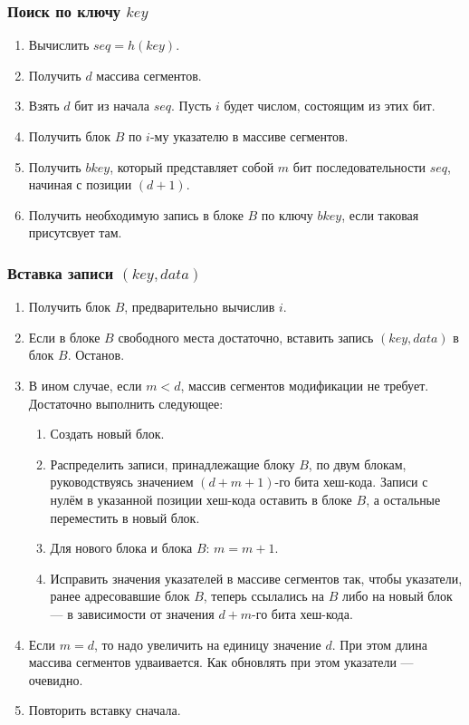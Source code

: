 \subsubsection{Поиск по ключу $key$}
\begin{enumerate}
  \item Вычислить $seq = h(key)$.
  \item Получить $d$ массива сегментов.
  \item Взять $d$ бит из начала $seq$. Пусть $i$ будет числом, состоящим из этих бит.
  \item Получить блок $B$ по $i$-му указателю в массиве сегментов.
  \item Получить $bkey$, который представляет собой $m$ бит последовательности $seq$, начиная с позиции $(d + 1)$.
  \item Получить необходимую запись в блоке $B$ по ключу $bkey$, если таковая присутсвует там.
\end{enumerate}

\subsubsection{Вставка записи $(key, data)$}

\begin{enumerate}
  \item Получить блок $B$, предварительно вычислив $i$.
  \item Если в блоке $B$ свободного места достаточно, вставить запись $(key, data)$ в блок $B$. Останов.
  \item В ином случае, если $m < d$, массив сегментов модификации не требует. Достаточно выполнить следующее:
    \begin{enumerate}
      \item Создать новый блок.
      \item Распределить записи, принадлежащие блоку $B$, по двум блокам, руководствуясь значением $(d + m + 1)$-го бита хеш-кода. Записи с нулём в указанной позиции хеш-кода оставить в блоке $B$, а остальные переместить в новый блок.
      \item Для нового блока и блока $B$: $m = m + 1$.
      \item Исправить значения указателей в массиве сегментов так, чтобы указатели, ранее адресовавшие блок $B$, теперь ссылались на $B$ либо на новый блок — в зависимости от значения $d + m$-го бита хеш-кода.
    \end{enumerate}

  \item Если $m = d$, то надо увеличить на единицу значение $d$. При этом длина массива сегментов удваивается. Как обновлять при этом указатели — очевидно.
  \item Повторить вставку сначала.
\end{enumerate}

